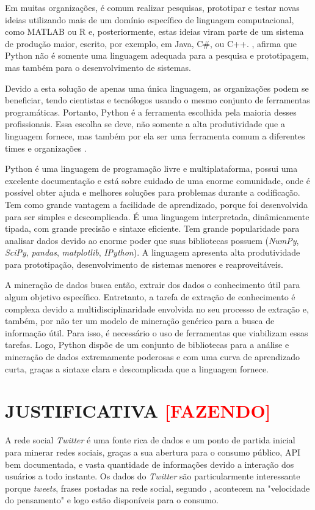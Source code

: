 Em muitas organizações, é comum realizar pesquisas, prototipar e testar novas ideias utilizando mais de um domínio específico de linguagem computacional, como MATLAB ou R e, posteriormente, estas ideias viram parte de um sistema de produção maior, escrito, por exemplo, em Java, C\#, ou C++. , afirma que Python não é somente uma linguagem adequada para a pesquisa e prototipagem, mas também para o desenvolvimento de sistemas.

Devido a esta solução de apenas uma única linguagem, as organizações podem se beneficiar, tendo cientistas e tecnólogos usando o mesmo conjunto de ferramentas programáticas. Portanto, Python é a ferramenta escolhida pela maioria desses profissionais. Essa escolha se deve, não somente a alta produtividade que a linguagem fornece, mas também por ela ser uma ferramenta comum a diferentes times e organizações \cite{kaldero}. 

Python é uma linguagem de programação livre e multiplataforma, possui uma excelente documentação e está sobre cuidado de uma enorme comunidade, onde é possível obter ajuda e melhores soluções para problemas durante a codificação. Tem como grande vantagem a facilidade de aprendizado, porque foi desenvolvida para ser simples e descomplicada. É uma linguagem interpretada, dinâmicamente tipada, com grande precisão e sintaxe eficiente. Tem grande popularidade para analisar dados devido ao enorme poder que suas bibliotecas possuem (\textit{NumPy}, \textit{SciPy}, \textit{pandas}, \textit{matplotlib}, \textit{IPython}). A linguagem apresenta alta produtividade para prototipação, desenvolvimento de sistemas menores e reaproveitáveis.

A mineração de dados busca então, extrair dos dados o conhecimento útil para algum objetivo específico. Entretanto, a tarefa de extração de conhecimento é complexa devido a multidisciplinaridade envolvida no seu processo de extração e, também, por não ter um modelo de mineração genérico para a busca de informação útil. Para isso, é necessário o uso de ferramentas que viabilizam essas tarefas. Logo, Python dispõe de um conjunto de bibliotecas para a análise e mineração de dados extremamente poderosas e com uma curva de aprendizado curta, graças a sintaxe clara e descomplicada que a linguagem fornece.


\section{JUSTIFICATIVA \textbf{\textcolor{red}{[FAZENDO]}}}\label{sec:justificativa}
A rede social \textit{Twitter} é uma fonte rica de dados e um ponto de partida inicial para minerar redes sociais, graças a sua abertura para o consumo público, API bem documentada, e vasta quantidade de informações devido a interação dos usuários a todo instante. Os dados do \textit{Twitter} são particularmente interessante porque \textit{tweets}, frases postadas na rede social, segundo , acontecem na "velocidade do pensamento" e logo estão disponíveis para o consumo.

